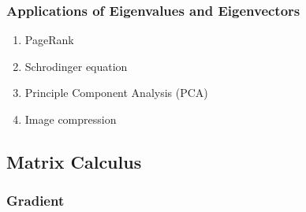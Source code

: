 \documentclass[letterpaper,12pt]{article}
\begin{document}
\subsubsection{Applications of Eigenvalues and Eigenvectors}
\begin{enumerate}
 \item PageRank
 \item Schrodinger equation
 \item Principle Component Analysis (PCA)
 \item Image compression
\end{enumerate}

\subsection{Matrix Calculus}
\subsubsection{Gradient}
\end{document}

